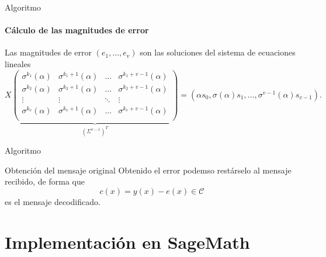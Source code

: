 \documentclass[spanish,aspectratio=169]{beamer}
\begin{document}
\begin{frame}{Algoritmo}
  \framesubtitle{Cálculo de las magnitudes de error}
  \begin{theorem}
    \label{prop:pgz-sesgados-magnitudes-error}
    Las magnitudes de error \((e_{1}, \dots, e_{v})\) son las soluciones del sistema de ecuaciones lineales
    \[
    X \underbrace{
    \begin{pmatrix}
      \sigma^{k_1}(\alpha) & \sigma^{k_1 + 1}(\alpha) & \dots & \sigma^{k_1 + v - 1}(\alpha)\\ 
      \sigma^{k_2}(\alpha) & \sigma^{k_2 + 1}(\alpha) & \dots & \sigma^{k_2 + v - 1}(\alpha)\\ 
      \vdots & \vdots & \ddots & \vdots\\ 
      \sigma^{k_v}(\alpha) & \sigma^{k_v + 1}(\alpha) & \dots & \sigma^{k_v + v - 1}(\alpha)\\ 
    \end{pmatrix}
    }_{(\Sigma^{v-1})^T}
    = (\alpha s_0, \sigma(\alpha)s_1, \dots, \sigma^{v-1}(\alpha)s_{v-1}).
    \]
  \end{theorem}
\end{frame}

\begin{frame}{Algoritmo}
  \begin{algorithm}[H]
    \DontPrintSemicolon
    \setcounter{AlgoLine}{17}
  \end{algorithm}
\end{frame}

\begin{frame}{Obtención del mensaje original}
  Obtenido el error podemso restárselo al mensaje recibido, de forma que
  \[
  c(x) = y(x) - e(x) \in \mathcal C
  \]
  es el mensaje decodificado.
\end{frame}



\section{Implementación en SageMath}
\end{document}
